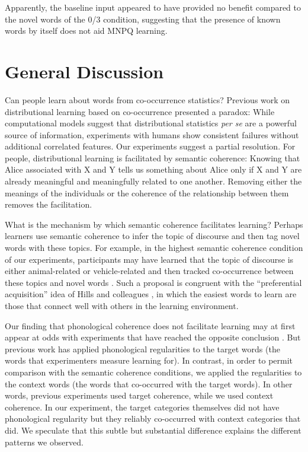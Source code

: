 \documentclass[man,longtable,floatsintext]{my-apa6}
\begin{document}
Apparently, the baseline input appeared to have provided no benefit compared to the novel words of the 0/3 condition, suggesting that the presence of known words by itself does not aid MNPQ learning.

\section{General Discussion}

Can people learn about words from co-occurrence statistics? Previous work on distributional learning based on co-occurrence presented a paradox: While computational models suggest that distributional statistics \emph{per se} are a powerful source of information, experiments with humans show consistent failures without additional correlated features. Our experiments suggest a partial resolution. For people, distributional learning is facilitated by semantic coherence: Knowing that Alice associated with X and Y tells us something about Alice only if X and Y are already meaningful and meaningfully related to one another. Removing either the meanings of the individuals or the coherence of the relationship between them removes the facilitation.

What is the mechanism by which semantic coherence facilitates learning? Perhaps learners use semantic coherence to infer the topic of discourse and then tag novel words with these topics. For example, in the highest semantic coherence condition of our experiments, participants may have learned that the topic of discourse is either animal-related or vehicle-related and then tracked co-occurrence between these topics and novel words \citep{frank2013}. Such a proposal is congruent with the ``preferential acquisition'' idea of Hills and colleagues \citeyearpar{hills2009, hills2010}, in which the easiest words to learn are those that connect well with others in the learning environment.

Our finding that phonological coherence does not facilitate learning may at first appear at odds with experiments that have reached the opposite conclusion \citep{frigo1998, lany2010, monaghan2005}. But previous work has applied phonological regularities to the target words (the words that experimenters measure learning for).  In contrast, in order to permit comparison with the semantic coherence conditions, we applied the regularities to the context words (the words that co-occurred with the target words). In other words, previous experiments used target coherence, while we used context coherence. In our experiment, the target categories themselves did not have phonological regularity but they reliably co-occurred with context categories that did. We speculate that this subtle but substantial difference explains the different patterns we observed.
\end{document}
